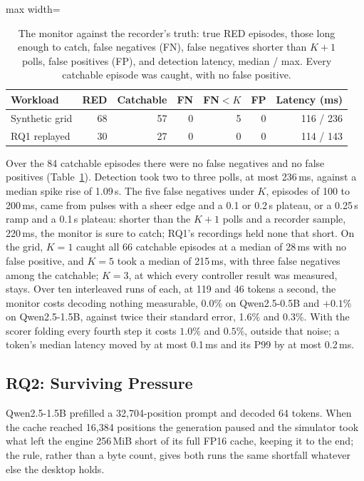 \documentclass{article}
\begin{document}
\begin{table}[t]
\caption{The monitor against the recorder's truth: true RED episodes, those long
enough to catch, false negatives (FN), false negatives shorter than $K+1$
polls, false positives (FP), and detection latency, median / max. Every
catchable episode was caught, with no false positive.}
\label{tab:detection}
\centering
\small
\begin{adjustbox}{max width=\columnwidth}
\begin{tabular}{lrrrrrr}
\toprule
Workload & RED & Catchable & FN & FN${<}K$ & FP & Latency (ms) \\
\midrule
Synthetic grid & 68 & 57 & 0 & 5 & 0 & 116 / 236 \\
RQ1 replayed & 30 & 27 & 0 & 0 & 0 & 114 / 143 \\
\bottomrule
\end{tabular}
\end{adjustbox}
\end{table}

Over the 84 catchable episodes there were no false negatives and no false
positives (Table~\ref{tab:detection}). Detection took two to three polls, at
most 236\,ms, against a median spike rise of 1.09\,s. The five false negatives
under $K$, episodes of 100 to 200\,ms, came from pulses with a sheer edge and a
0.1 or 0.2\,s plateau, or a 0.25\,s ramp and a 0.1\,s plateau: shorter than
the $K + 1$ polls and a recorder sample, 220\,ms, the monitor is sure to catch;
RQ1's recordings held none that short. On the grid, $K = 1$ caught all 66
catchable episodes at a median of 28\,ms with no false positive, and $K = 5$
took a median of 215\,ms, with three false negatives among the catchable;
$K = 3$, at which every controller result was measured, stays. Over ten
interleaved runs of each, at 119 and 46 tokens a second, the monitor costs
decoding nothing measurable, $0.0\%$ on Qwen2.5-0.5B and $+0.1\%$ on
Qwen2.5-1.5B, against twice their standard error, 1.6\% and 0.3\%. With the
scorer folding every fourth step it costs $1.0\%$ and $0.5\%$, outside that
noise; a token's median latency moved by at most 0.1\,ms and its P99 by at most
0.2\,ms.

\subsection{RQ2: Surviving Pressure}
\label{sec:survival}

Qwen2.5-1.5B prefilled a 32{,}704-position prompt and decoded 64 tokens. When
the cache reached 16{,}384 positions the generation paused and the simulator
took what left the engine 256\,MiB short of its full FP16 cache, keeping it to
the end; the rule, rather than a byte count, gives both runs the same shortfall
whatever else the desktop holds.
\end{document}
